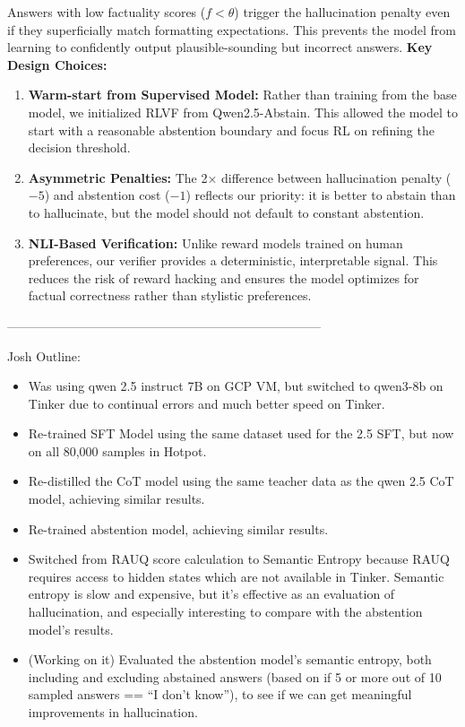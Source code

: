 \documentclass{article}
\begin{document}
Answers with low factuality scores ($f < \theta$) trigger the hallucination penalty even if they superficially match formatting expectations. This prevents the model from learning to confidently output plausible-sounding but incorrect answers.
\textbf{Key Design Choices:} 
\begin{enumerate}
    \item \textbf{Warm-start from Supervised Model:} Rather than training from the base model, we initialized RLVF from Qwen2.5-Abstain. This allowed the model to start with a reasonable abstention boundary and focus RL on refining the decision threshold.
    \item \textbf{Asymmetric Penalties:} The 2× difference between hallucination penalty ($-5$) and abstention cost ($-1$) reflects our priority: it is better to abstain than to hallucinate, but the model should not default to constant abstention.
    \item \textbf{NLI-Based Verification:} Unlike reward models trained on human preferences, our verifier provides a deterministic, interpretable signal. This reduces the risk of reward hacking and ensures the model optimizes for factual correctness rather than stylistic preferences.
\end{enumerate}
---------------------------------------------------------------------------

Josh Outline: 
\begin{itemize}
    \item Was using qwen 2.5 instruct 7B on GCP VM, but switched to qwen3-8b on Tinker due to continual errors and much better speed on Tinker.
    \item Re-trained SFT Model using the same dataset used for the 2.5 SFT, but now on all 80,000 samples in Hotpot.
    \item Re-distilled the CoT model using the same teacher data as the qwen 2.5 CoT model, achieving similar results.
    \item Re-trained abstention model, achieving similar results.
    \item Switched from RAUQ score calculation to Semantic Entropy because RAUQ requires access to hidden states which are not available in Tinker. Semantic entropy is slow and expensive, but it's effective as an evaluation of hallucination, and especially interesting to compare with the abstention model's results.
    \item (Working on it) Evaluated the abstention model's semantic entropy, both including and excluding abstained answers (based on if 5 or more out of 10 sampled answers == ``I don't know''), to see if we can get meaningful improvements in hallucination.
\end{itemize}
\end{document}
